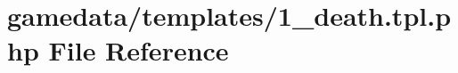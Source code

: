 \hypertarget{1__death_8tpl_8php}{\section{gamedata/templates/1\+\_\+death.tpl.\+php File Reference}
\label{1__death_8tpl_8php}
}
